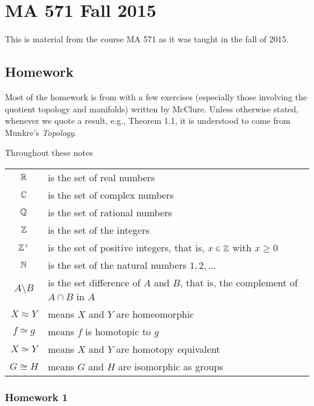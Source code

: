 \section{MA 571 Fall 2015}
This is material from the course MA 571 as it was taught in the fall of
2015.%
\bigskip
\subsection{Homework}
 Most of the homework is from \cite{munkres} with a few exercises
(especially those involving the quotient topology and manifolds) written by
McClure. Unless otherwise stated, whenever we quote a result, e.g., Theorem
1.1, it is understood to come from Munkre's \emph{Topology}.

Throughout these notes

\begin{tabular}{cl}
  $\mathbb{R}$ & is the set of real numbers\\
  $\mathbb{C}$ & is the set of complex numbers\\
  $\mathbb{Q}$ & is the set of rational numbers\\
  $\mathbb{Z}$ & is the set of the integers\\
  $\mathbb{Z}^+$ & is the set of positive integers, that is, $x\in\mathbb{Z}$ with
             $x\geq 0$\\
  $\mathbb{N}$ & is the set of the natural numbers $1,2,\ldots$\\
  $A\setminus B$ & is the set difference of $A$ and $B$, that is, the
                        complement of $A\cap B$ in $A$\\
  $X\approx Y$& means $X$ and $Y$ are homeomorphic\\
  $f\simeq g$& means $f$ is homotopic to $g$\\
  $X\simeq Y$&means $X$ and $Y$ are homotopy equivalent\\
  $G\cong H$& means $G$ and $H$ are isomorphic as groups
\end{tabular}

\newpage
\subsubsection{Homework 1}
\setcounter{exercise}{0}
\setcounter{equation}{0}


